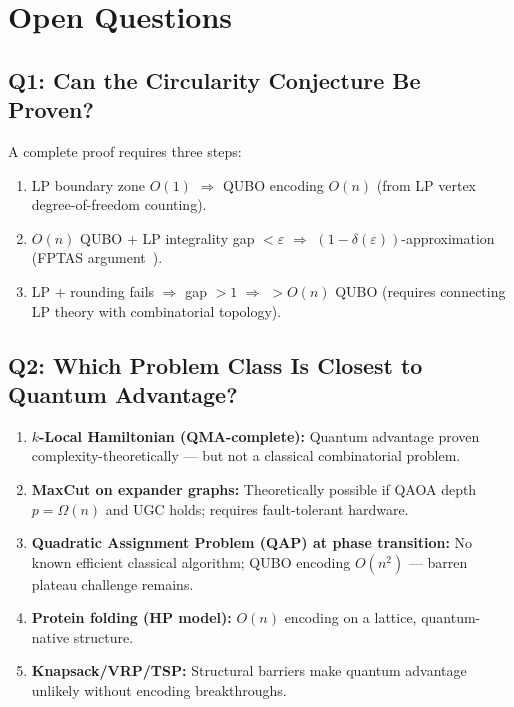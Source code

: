 \documentclass[11pt]{article}
\theoremstyle{remark}
\begin{document}
\section{Open Questions}
\label{sec:open}

\subsection*{Q1: Can the Circularity Conjecture Be Proven?}

A complete proof requires three steps:
\begin{enumerate}
\item LP boundary zone $O(1)$ $\Rightarrow$ QUBO encoding $O(n)$
  (from LP vertex degree-of-freedom counting).
\item $O(n)$ QUBO + LP integrality gap $< \varepsilon$
  $\Rightarrow$ $(1-\delta(\varepsilon))$-approximation
  (FPTAS argument~\cite{vazirani2001}).
\item LP + rounding fails $\Rightarrow$ gap $> 1$
  $\Rightarrow$ $> O(n)$ QUBO
  (requires connecting LP theory with combinatorial topology).
\end{enumerate}

\subsection*{Q2: Which Problem Class Is Closest to Quantum Advantage?}

\begin{enumerate}
\item \textbf{$k$-Local Hamiltonian (QMA-complete):} Quantum advantage
  proven complexity-theoretically --- but not a classical combinatorial problem.
\item \textbf{MaxCut on expander graphs:} Theoretically possible if QAOA
  depth $p = \Omega(n)$ and UGC holds; requires fault-tolerant hardware.
\item \textbf{Quadratic Assignment Problem (QAP) at phase transition:}
  No known efficient classical algorithm; QUBO encoding $O(n^2)$ --- barren
  plateau challenge remains.
\item \textbf{Protein folding (HP model):} $O(n)$ encoding on a lattice,
  quantum-native structure.
\item \textbf{Knapsack/VRP/TSP:} Structural barriers make quantum advantage
  unlikely without encoding breakthroughs.
\end{enumerate}
\end{document}
